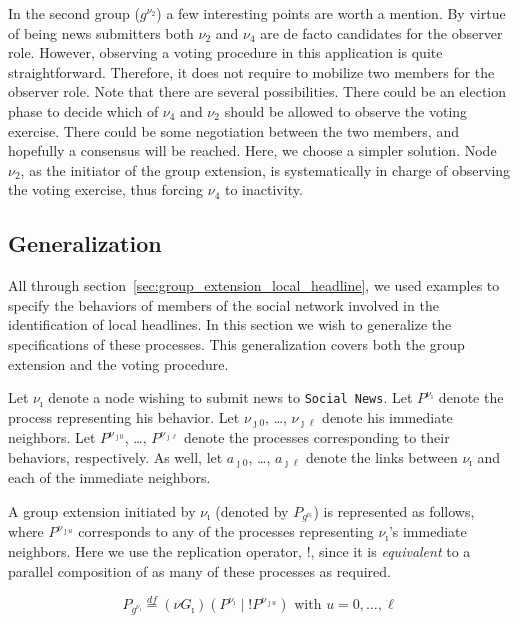 In the second group ($g^{\nu_2}$) a few interesting points are worth a mention. By virtue of being news submitters both
$\nu_2$ and $\nu_4$ are de facto candidates for the observer role. However, observing a voting procedure in this
application is quite straightforward. Therefore, it does not require to mobilize two members for the observer role. Note
that there are several possibilities. There could be an election phase to decide which of $\nu_4$ and $\nu_2$ should be
allowed to observe the voting exercise. There could be some negotiation between the two members, and hopefully a
consensus will be reached. Here, we choose a simpler solution. Node $\nu_2$, as the initiator of the group extension, is
systematically in charge of observing the voting exercise, thus forcing $\nu_4$ to inactivity.


\subsection{Generalization} %
\label{sub:generalization}

All through section~\ref{sec:group_extension_local_headline}, we used examples to specify the behaviors of members of the social network
involved in the identification of local headlines. In this section we wish to generalize the specifications of these processes. This generalization covers both the group extension and the voting procedure.

Let $\nu_\imath$ denote a node wishing to submit news to {\tt Social News}. Let $P^{\nu_\imath}$ denote the process representing his behavior. Let $\nu_{\jmath 0}$, \ldots, $\nu_{\jmath\ell}$ denote his immediate neighbors. Let $P^{\nu_{\jmath 0}}$, \ldots, $P^{\nu_{\jmath \ell}}$ denote the processes corresponding to their behaviors, respectively. As well, let $a_{\jmath 0}$, \ldots, $a_{\jmath\ell}$ denote the links between $\nu_\imath$ and each of the immediate neighbors.

A group extension initiated by $\nu_\imath$ (denoted by $P_{g^{\nu_\imath}}$) is represented as follows, where
$P^{\nu_{\jmath u}}$ corresponds to any of the processes representing $\nu_\imath$'s immediate neighbors. Here we use the
replication operator, $!$, since it is \emph{equivalent} to a parallel composition of as many of these processes as
required.

\begin{equation}
	\label{eq:gvi-formation}
	P_{g^{\nu_\imath}}\overset{df}{=}(\nu G_\imath)(P^{\nu_\imath}\mid !P^{\nu_{\jmath u}})	\mbox{ with } u=0,\ldots,\ell
\end{equation}

